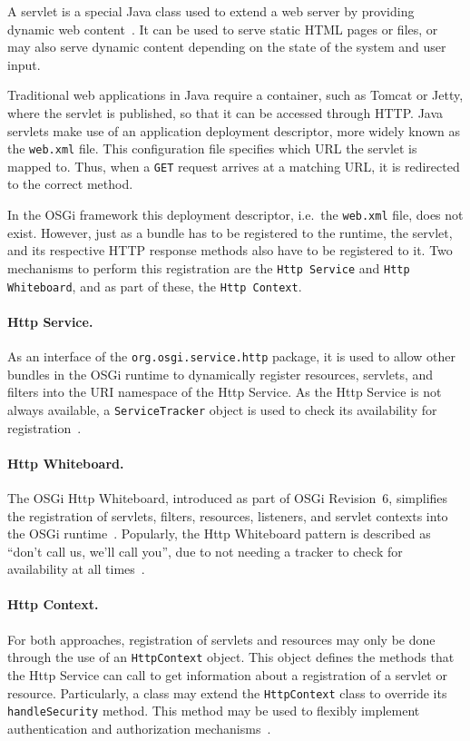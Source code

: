 \documentclass[12pt]{article}
\begin{document}
A servlet is a special Java class used to extend a web server by providing dynamic web content~\cite{servlet}. It can be used to serve static HTML pages or files, or may also serve dynamic content depending on the state of the system and user input.

Traditional web applications in Java require a container, such as Tomcat or Jetty, where the servlet is published, so that it can be accessed through HTTP. Java servlets make use of an application deployment descriptor, more widely known as the \texttt{web.xml} file. This configuration file specifies which URL the servlet is mapped to. Thus, when a \texttt{GET} request arrives at a matching URL, it is redirected to the correct method.

In the OSGi framework this deployment descriptor, i.e.\ the \texttt{web.xml} file, does not exist. However, just as a bundle has to be registered to the runtime, the servlet, and its respective HTTP response methods also have to be registered to it. Two mechanisms to perform this registration are the \texttt{Http Service} and \texttt{Http Whiteboard}, and as part of these, the \texttt{Http Context}.

\paragraph{Http Service.} As an interface of the \texttt{org.osgi.service.http} package, it is used to allow other bundles in the OSGi runtime to dynamically register resources, servlets, and filters into the URI namespace of the Http Service. As the Http Service is not always available, a \texttt{ServiceTracker} object is used to check its availability for registration~\cite{httpservice}.

\paragraph{Http Whiteboard.} The OSGi Http Whiteboard, introduced as part of OSGi Revision~6, simplifies the registration of servlets, filters, resources, listeners, and servlet contexts into the OSGi runtime~\cite{httpwhiteboard_01}. Popularly, the Http Whiteboard pattern is described as ``don't call us, we'll call you'', due to not needing a tracker to check for availability at all times~\cite{httpwhiteboard_02}.

\paragraph{Http Context.} For both approaches, registration of servlets and resources may only be done through the use of an \texttt{HttpContext} object. This object defines the methods that the Http Service can call to get information about a registration of a servlet or resource.  Particularly, a class may extend the \texttt{HttpContext} class to override its \texttt{handleSecurity} method. This method may be used to flexibly implement authentication and authorization mechanisms~\cite{httpcontext}.
\end{document}
